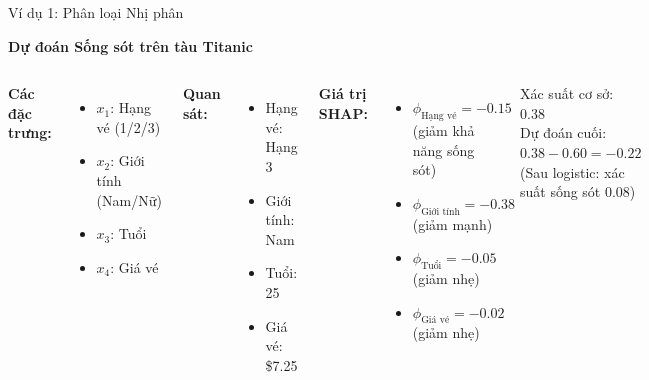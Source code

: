 \documentclass[notheorems, aspectratio=149]{beamer}
\begin{document}
\begin{frame}{Ví dụ 1: Phân loại Nhị phân}

\textbf{Dự đoán Sống sót trên tàu Titanic}
\vspace{1cm}
\begin{columns}
\textbf{Các đặc trưng:}
\begin{itemize}
    \item $x_1$: Hạng vé (1/2/3)
    \item $x_2$: Giới tính (Nam/Nữ)
    \item $x_3$: Tuổi
    \item $x_4$: Giá vé
\end{itemize}

\vspace{0.3cm}
\textbf{Quan sát:}
\begin{itemize}
    \item Hạng vé: Hạng 3
    \item Giới tính: Nam
    \item Tuổi: 25
    \item Giá vé: \$7.25
\end{itemize}

\textbf{Giá trị SHAP:}
\begin{itemize}
    \item $\phi_{\text{Hạng vé}} = -0.15$ (giảm khả năng sống sót)
    \item $\phi_{\text{Giới tính}} = -0.38$ (giảm mạnh)
    \item $\phi_{\text{Tuổi}} = -0.05$ (giảm nhẹ)
    \item $\phi_{\text{Giá vé}} = -0.02$ (giảm nhẹ)
\end{itemize}

\vspace{0.3cm}
Xác suất cơ sở: 0.38\\
Dự đoán cuối: $0.38 - 0.60 = -0.22$ \\
(Sau logistic: xác suất sống sót 0.08)
\end{columns}
\end{frame}
\end{document}
